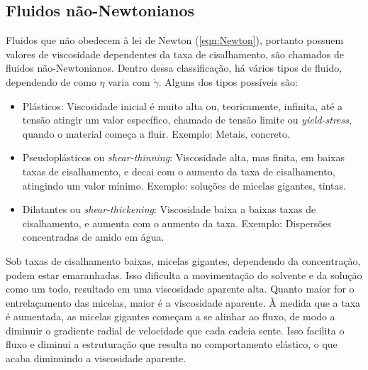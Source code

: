 			\subsection{Fluidos não-Newtonianos} 
			\label{sec:teoria_fluidos_NN}
			Fluidos que não obedecem à lei de Newton (\autoref{eqn:Newton}), portanto possuem valores de viscosidade dependentes da taxa de cisalhamento, são chamados de fluidos não-Newtonianos. Dentro dessa classificação, há vários tipos de fluido, dependendo de como \(\eta\) varia com \(\dot{\gamma}\). Alguns dos tipos possíveis são:\cite{Kronberg2014a}
			
			\begin{itemize}[noitemsep]
				\item Plásticos: Viscosidade inicial é muito alta ou, teoricamente, infinita, até a tensão atingir um valor específico, chamado de tensão limite ou \emph{yield-stress}, quando o material começa a fluir. Exemplo: Metais, concreto.
				\item Pseudoplásticos ou \emph{shear-thinning}: Viscosidade alta, mas finita, em baixas taxas de cisalhamento, e decai com o aumento da taxa de cisalhamento, atingindo um valor mínimo. Exemplo: soluções de micelas gigantes, tintas.
				\item Dilatantes ou \emph{shear-thickening}: Viscosidade baixa a baixas taxas de cisalhamento, e aumenta com o aumento da taxa. Exemplo: Dispersões concentradas de amido em água.
			\end{itemize}
			
			
			Sob taxas de cisalhamento baixas, micelas gigantes, dependendo da concentração, podem estar emaranhadas. Isso dificulta a movimentação do solvente e da solução como um todo, resultado em uma viscosidade aparente alta. Quanto maior for o entrelaçamento das micelas, maior é a viscosidade aparente.    À medida que a taxa é aumentada, as micelas gigantes começam a se alinhar ao fluxo, de modo a diminuir o gradiente radial de velocidade que cada cadeia sente. Isso facilita o fluxo e diminui a estruturação que resulta no comportamento elástico, o que acaba diminuindo a viscosidade aparente.\cite{Rehage1991}
			

